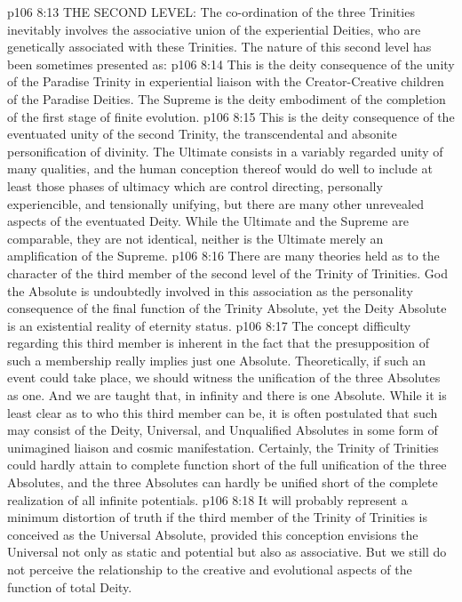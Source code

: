 \pc \vs p106 8:13 THE SECOND LEVEL: The co\hyp{}ordination of the three Trinities inevitably involves the associative union of the experiential Deities, who are genetically associated with these Trinities. The nature of this second level has been sometimes presented as:
\pc \vs p106 8:14 \bibnobreakspace {} This is the deity consequence of the unity of the Paradise Trinity in experiential liaison with the Creator\hyp{}Creative children of the Paradise Deities. The Supreme is the deity embodiment of the completion of the first stage of finite evolution.
\pc \vs p106 8:15 \bibnobreakspace {} This is the deity consequence of the eventuated unity of the second Trinity, the transcendental and absonite personification of divinity. The Ultimate consists in a variably regarded unity of many qualities, and the human conception thereof would do well to include at least those phases of ultimacy which are control directing, personally experiencible, and tensionally unifying, but there are many other unrevealed aspects of the eventuated Deity. While the Ultimate and the Supreme are comparable, they are not identical, neither is the Ultimate merely an amplification of the Supreme.
\pc \vs p106 8:16 \bibnobreakspace {} There are many theories held as to the character of the third member of the second level of the Trinity of Trinities. God the Absolute is undoubtedly involved in this association as the personality consequence of the final function of the Trinity Absolute, yet the Deity Absolute is an existential reality of eternity status.
\vs p106 8:17 The concept difficulty regarding this third member is inherent in the fact that the presupposition of such a membership really implies just one Absolute. Theoretically, if such an event could take place, we should witness the  unification of the three Absolutes as one. And we are taught that, in infinity and  there is one Absolute. While it is least clear as to who this third member can be, it is often postulated that such may consist of the Deity, Universal, and Unqualified Absolutes in some form of unimagined liaison and cosmic manifestation. Certainly, the Trinity of Trinities could hardly attain to complete function short of the full unification of the three Absolutes, and the three Absolutes can hardly be unified short of the complete realization of all infinite potentials.
\vs p106 8:18 It will probably represent a minimum distortion of truth if the third member of the Trinity of Trinities is conceived as the Universal Absolute, provided this conception envisions the Universal not only as static and potential but also as associative. But we still do not perceive the relationship to the creative and evolutional aspects of the function of total Deity.
